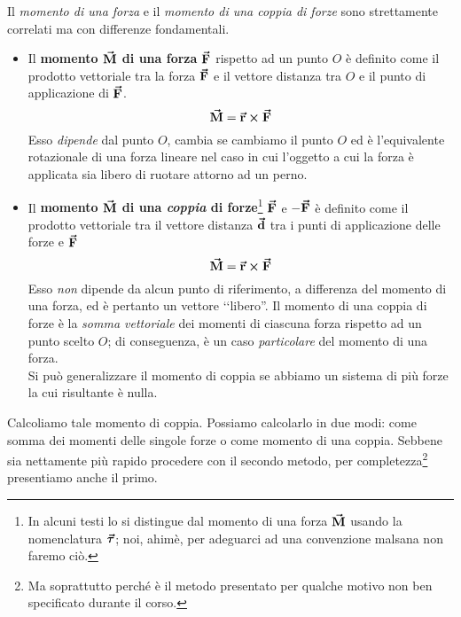 \begin{attention}
	Il \textit{momento di una forza} e il \textit{momento di una coppia di forze} sono strettamente correlati ma con differenze fondamentali.
	\begin{itemize}
		\item Il \textbf{momento $\vb*{\va{M}}$ di una forza} $\vb*{\va{F}}$ rispetto ad un punto $O$ è definito come il prodotto vettoriale tra la forza $\vb*{\va{F}}$ e il vettore distanza tra $O$ e il punto di applicazione di $\vb*{\va{F}}$.
		\begin{equation}
			\vb*{\va{M}}=\vb*{\va{r}}\cross\vb*{\va{F}}
		\end{equation}
		Esso \textit{dipende} dal punto $O$, cambia se cambiamo il punto $O$ ed è l'equivalente rotazionale di una forza lineare nel caso in cui l'oggetto a cui la forza è applicata sia libero di ruotare attorno ad un perno.
		\item Il \textbf{momento $\vb*{\va{M}}$ di una \emph{coppia} di forze}\footnote{In alcuni testi lo si distingue dal momento di una forza $\vb*{\va{M}}$ usando la nomenclatura $\vb*{\va{\tau}}$; noi, ahimè, per adeguarci ad una convenzione malsana non faremo ciò.} $\vb*{\va{F}}$ e $-\vb*{\va{F}}$ è definito come il prodotto vettoriale tra il vettore distanza $\vb*{\va{d}}$  tra i punti di applicazione delle forze e $\vb*{\va{F}}$
		\begin{equation}
			\vb*{\va{M}}=\vb*{\va{r}}\cross\vb*{\va{F}}
		\end{equation}
		Esso \textit{non} dipende da alcun punto di riferimento, a differenza del momento di una forza, ed è pertanto un vettore ‘‘libero''. Il momento di una coppia di forze è la \textit{somma vettoriale} dei momenti di ciascuna forza rispetto ad un punto scelto $O$; di conseguenza, è un caso \textit{particolare} del momento di una forza.\\ %
		Si può generalizzare il momento di coppia se abbiamo un sistema di più forze la cui risultante è nulla.
	\end{itemize}
\end{attention}
Calcoliamo tale momento di coppia. Possiamo calcolarlo in due modi: come somma dei momenti delle singole forze o come momento di una coppia. Sebbene sia nettamente più rapido procedere con il secondo metodo, per completezza\footnote{Ma soprattutto perché è il metodo presentato per qualche motivo non ben specificato durante il corso.} presentiamo anche il primo.
